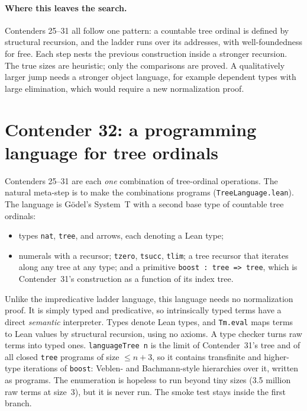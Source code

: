 \documentclass[11pt]{article}
\theoremstyle{definition}
\theoremstyle{remark}
\newcommand{\lean}[1]{\texttt{#1}}
\begin{document}
\paragraph{Where this leaves the search.} Contenders 25--31 all follow one
pattern: a countable tree ordinal is defined by structural recursion, and the
ladder runs over its addresses, with well-foundedness for free. Each step
nests the previous construction inside a stronger recursion. The true sizes are
heuristic; only the comparisons are proved. A qualitatively larger jump needs a
stronger object language, for example dependent types with large elimination,
which would require a new normalization proof.

\section{Contender 32: a programming language for tree ordinals}

Contenders 25--31 are each \emph{one} combination of tree-ordinal operations.
The natural meta-step is to make the combinations programs
(\lean{TreeLanguage.lean}). The language is Gödel's System~T with a second base
type of countable tree ordinals:
\begin{itemize}
\item types \lean{nat}, \lean{tree}, and arrows, each denoting a Lean type;
\item numerals with a recursor; \lean{tzero}, \lean{tsucc}, \lean{tlim}; a tree
  recursor that iterates along any tree at any type; and a primitive
  \lean{boost : tree => tree}, which is Contender~31's construction as a
  function of its index tree.
\end{itemize}
Unlike the impredicative ladder language, this language needs no normalization
proof. It is simply typed and predicative, so intrinsically typed terms have a
direct \emph{semantic} interpreter. Types denote Lean types, and \lean{Tm.eval}
maps terms to Lean values by structural recursion, using no axioms. A type
checker turns raw terms into typed ones. \lean{languageTree n} is the limit of
Contender~31's tree and of all closed \lean{tree} programs of size $\le n{+}3$,
so it contains transfinite and higher-type iterations of \lean{boost}: Veblen-
and Bachmann-style hierarchies over it, written as programs. The enumeration
is hopeless to run beyond tiny sizes (3.5 million raw terms at size~3), but it
is never run. The smoke test stays inside the first branch.
\end{document}
